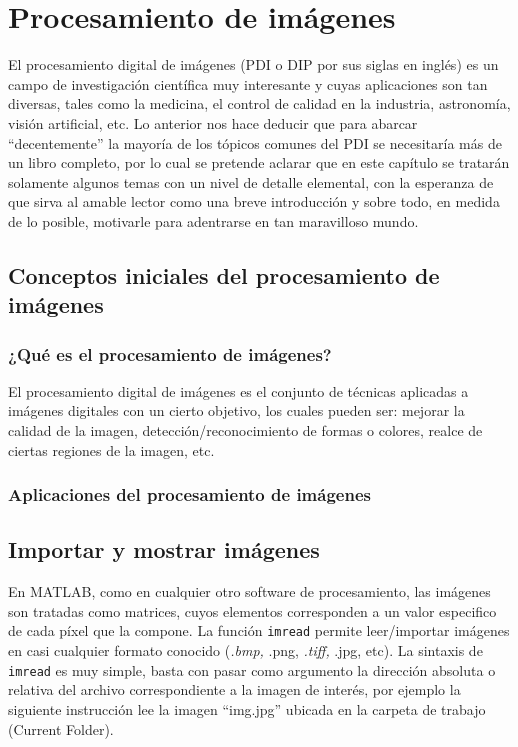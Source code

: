 \chapter{Procesamiento de imágenes}\label{procesamiento-de-imagenes}

El procesamiento digital de imágenes (PDI o DIP por sus siglas en
inglés) es un campo de investigación científica muy interesante y cuyas
aplicaciones son tan diversas, tales como la medicina, el control de
calidad en la industria, astronomía, visión artificial, etc. Lo anterior
nos hace deducir que para abarcar ``decentemente'' la mayoría de los
tópicos comunes del PDI se necesitaría más de un libro completo, por lo
cual se pretende aclarar que en este capítulo se tratarán solamente
algunos temas con un nivel de detalle elemental, con la esperanza de que
sirva al amable lector como una breve introducción y sobre todo, en
medida de lo posible, motivarle para adentrarse en tan maravilloso mundo.

\section{Conceptos iniciales del procesamiento de imágenes}

\subsection{¿Qué es el procesamiento de imágenes?}

El procesamiento digital de imágenes es el conjunto de técnicas
aplicadas a imágenes digitales con un cierto objetivo, los cuales pueden
ser: mejorar la calidad de la imagen, detección/reconocimiento de formas
o colores, realce de ciertas regiones de la imagen, etc.

\subsection{Aplicaciones del procesamiento de imágenes}

\section{Importar y mostrar imágenes}

En MATLAB, como en cualquier otro software de procesamiento, las
imágenes son tratadas como matrices, cuyos elementos corresponden a un
valor especifico de cada píxel que la compone. La función
\texttt{imread} permite leer/importar imágenes en casi cualquier formato
conocido (\emph{.bmp, }.png, \emph{.tiff, }.jpg, etc). La sintaxis de
\texttt{imread} es muy simple, basta con pasar como argumento la
dirección absoluta o relativa del archivo correspondiente a la imagen de
interés, por ejemplo la siguiente instrucción lee la imagen ``img.jpg''
ubicada en la carpeta de trabajo (Current Folder).

